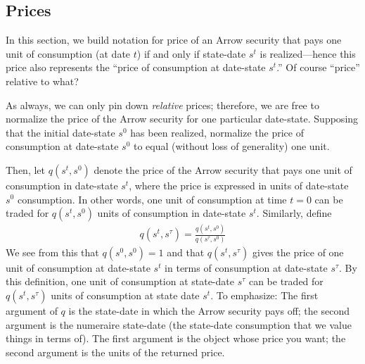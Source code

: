 \documentclass[12pt]{article}
\theoremstyle{plain}
\theoremstyle{definition}
\theoremstyle{remark}
\begin{document}
\subsection{Prices}


In this section, we build notation for price of an Arrow security that
pays one unit of consumption (at date $t$) if and only if state-date
$s^t$ is realized---hence this price also represents the ``price of
consumption at date-state $s^t$.''
Of course ``price'' relative to what?

As always, we can only pin down \emph{relative} prices; therefore, we
are free to normalize the price of the Arrow security for one particular
date-state.
Supposing that the initial date-state $s^0$ has been realized,
normalize the price of consumption at date-state $s^0$ to equal (without
loss of generality) one unit.

Then, let $q(s^t,s^0)$ denote the price of the Arrow security
that pays one unit of consumption in date-state $s^t$, where the price
is expressed in units of date-state $s^0$ consumption.
In other words, one unit of consumption at time $t=0$ can be traded for
$q(s^t,s^0)$ units of consumption in date-state $s^t$.
Similarly, define
\begin{align*}
  q(s^t,s^\tau)
  =
  \frac{q(s^t,s^0)}{q(s^\tau,s^0)}
\end{align*}
We see from this that $q(s^0,s^0)=1$ and that $q(s^t,s^\tau)$ gives the
price of one unit of consumption at date-state $s^t$ in terms of
consumption at date-state $s^\tau$.
By this definition, one unit of consumption at state-date $s^\tau$ can
be traded for $q(s^t,s^\tau)$ units of consumption at state date $s^t$.
To emphasize: The first argument of $q$ is the state-date in which the
Arrow security pays off; the second argument is the numeraire state-date
(the state-date consumption that we value things in terms of).
The first argument is the object whose price you want; the second
argument is the units of the returned price.



\end{document}
